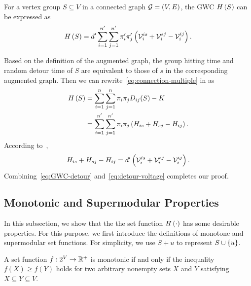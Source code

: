 \documentclass[10pt,twocolumn,twoside]{IEEEtran}
\begin{document}
    \begin{theorem}\label{thm:connection-electrical}
        For a vertex group \(S\subseteq V\) in a connected graph \(\mathcal{G}=(V,E)\), the GWC \(H\left(S\right)\) can be expressed as
        \begin{equation}\label{eq:connection-electrical}        H\left(S\right)=d'\sum_{i=1}^{n'}\sum_{j=1}^{n'}\pi'_i\pi'_j\left( \mathcal{V}_i^{is}+\mathcal{V}_i^{sj}-\mathcal{V}_i^{ij} \right).
        \end{equation}
    \end{theorem}
    \begin{IEEEproof}
        Based on the definition of the augmented graph, the group hitting time and random detour time of \(S\) are equivalent to those of \(s\) in the corresponding augmented graph.
        Then we can rewrite~\eqref{eq:connection-multiple} in  as
        \begin{equation}\label{eq:GWC-detour}
            \begin{split}
                H\left(S\right)&=\sum_{i=1}^n\sum_{j=1}^n\pi_i\pi_jD_{ij}(S)-K\\
                &=\sum_{i=1}^{n'}\sum_{j=1}^{n'}\pi_i\pi_j\left( H_{is}+H_{sj}-H_{ij} \right).
            \end{split}
        \end{equation}
        According to~\cite{RaZh13},
        \begin{equation}\label{eq:detour-voltage}
            H_{is}+H_{sj}-H_{ij}=d'\left( \mathcal{V}_i^{is}+\mathcal{V}_i^{sj}-\mathcal{V}_i^{ij} \right).
        \end{equation}
        Combining~\eqref{eq:GWC-detour} and~\eqref{eq:detour-voltage} completes our proof.
    \end{IEEEproof}
\fi

\subsection{Monotonic and Supermodular Properties}

In this subsection, we show that the the set function \(H\left(\cdot\right)\) has some desirable properties. For this purpose, we first introduce the definitions of monotone and supermodular set functions. For simplicity, we use \(S+u\) to represent \(S\cup\left\{u \right\}\).

\begin{definition}[Monotonicity]
    A set function \(f:2^{V}\to\mathbb{R}^+\) is monotonic if and only if the inequality \(f(X)\ge f(Y)\) holds for two arbitrary  nonempty sets \(X\) and \(Y\)  satisfying \(X\subseteq Y\subseteq V\).
\end{definition}
\end{document}
